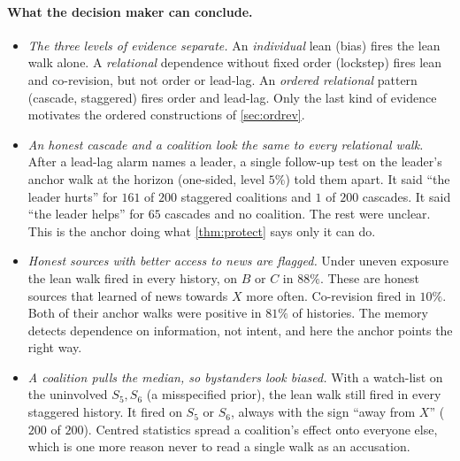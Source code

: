 \documentclass[11pt]{article}
\theoremstyle{definition}\newtheorem{definition}[theorem]{Definition}\newtheorem{remark}[theorem]{Remark}\newtheorem{example}[theorem]{Example}\newtheorem{problem}[theorem]{Open problem}\crefname{problem}{Problem}{Problems}
\begin{document}
\paragraph{What the decision maker can conclude.}
\begin{itemize}
\item \emph{The three levels of evidence separate.} An \emph{individual} lean (bias) fires the lean walk alone. A \emph{relational} dependence without fixed order (lockstep) fires lean and co-revision, but not order or lead-lag. An \emph{ordered relational} pattern (cascade, staggered) fires order and lead-lag. Only the last kind of evidence motivates the ordered constructions of \cref{sec:ordrev}.
\item \emph{An honest cascade and a coalition look the same to every relational walk.} After a lead-lag alarm names a leader, a single follow-up test on the leader's anchor walk at the horizon (one-sided, level $5\%$) told them apart. It said ``the leader hurts'' for $161$ of $200$ staggered coalitions and $1$ of $200$ cascades. It said ``the leader helps'' for $65$ cascades and no coalition. The rest were unclear. This is the anchor doing what \cref{thm:protect} says only it can do.
\item \emph{Honest sources with better access to news are flagged.} Under uneven exposure the lean walk fired in every history, on $B$ or $C$ in $88\%$. These are honest sources that learned of news towards $X$ more often. Co-revision fired in $10\%$. Both of their anchor walks were positive in $81\%$ of histories. The memory detects dependence on information, not intent, and here the anchor points the right way.
\item \emph{A coalition pulls the median, so bystanders look biased.} With a watch-list on the uninvolved $S_5,S_6$ (a misspecified prior), the lean walk still fired in every staggered history. It fired on $S_5$ or $S_6$, always with the sign ``away from $X$'' ($200$ of $200$). Centred statistics spread a coalition's effect onto everyone else, which is one more reason never to read a single walk as an accusation.
\end{itemize}
\end{document}
